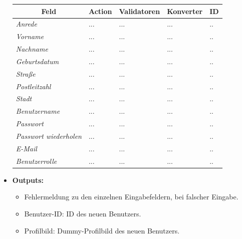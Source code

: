 \begin{itemize}
\begin{center}
\begin{longtable}{|p{3cm} |p{4cm} | p{4cm}|p{3cm} |p{2cm}|}
						\hline \multicolumn{1}{|c|}{\textbf{Feld}} & \multicolumn{1}{|c|}{\textbf{Action}} & \multicolumn{1}{|c|}{\textbf{Validatoren}}  &  \multicolumn{1}{|c|}{\textbf{Konverter}} &  \multicolumn{1}{|c|}{\textbf{ID}} \\ \hline
						\endfirsthead
						\hline
						\endlastfoot
						\textit{Anrede} & ... & ... & ... & ..\\ \hline
						\textit{Vorname} & ... & ... & ... & ..\\ \hline
						\textit{Nachname} & ... & ... & ... & ..\\ \hline
						\textit{Geburtsdatum} & ... & ... & ... & ..\\ \hline
						\textit{Straße} & ... & ... & ... & ..\\ \hline
						\textit{Postleitzahl} & ... & ... & ... & ..\\ \hline	
						\textit{Stadt} & ... & ... & ... & ..\\ \hline
						\textit{Benutzername} & ... & ... & ... & ..\\ \hline	
						\textit{Passwort} & ... & ... & ... & ..\\ \hline	
						\textit{Passwort wiederholen} & ... & ... & ... & ..\\ \hline
						\textit{E-Mail} & ... & ... & ... & ..\\ \hline
						\textit{Benutzerrolle} & ... & ... & ... & ..\\ \hline
					\end{longtable}
				\end{center}
			\item \textbf{Outputs:}
			\begin{itemize}
				\item Fehlermeldung zu den einzelnen Eingabefeldern, bei falscher Eingabe.
				\item Benutzer-ID: ID des neuen Benutzers.
				\item Profilbild: Dummy-Profilbild des neuen Benutzers.
			\end{itemize}
					\begin{center}
						\begin{longtable}{|p{5cm} | p{4cm}|p{3cm}|}
							

\end{longtable}
\end{center}
\end{itemize}
